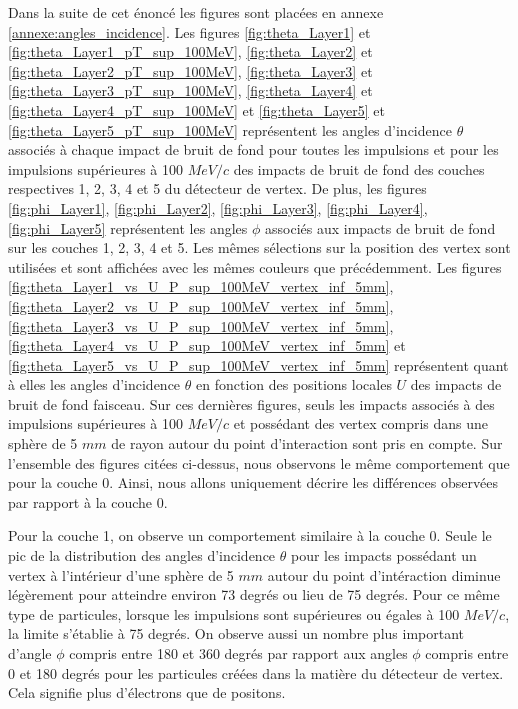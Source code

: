   Dans la suite de cet \'enonc\'e les figures sont plac\'ees en annexe \ref{annexe:angles_incidence}. Les figures \ref{fig:theta_Layer1} et \ref{fig:theta_Layer1_pT_sup_100MeV}, \ref{fig:theta_Layer2} et \ref{fig:theta_Layer2_pT_sup_100MeV}, \ref{fig:theta_Layer3} et \ref{fig:theta_Layer3_pT_sup_100MeV}, \ref{fig:theta_Layer4} et \ref{fig:theta_Layer4_pT_sup_100MeV} et \ref{fig:theta_Layer5} et \ref{fig:theta_Layer5_pT_sup_100MeV} repr\'esentent les angles d'incidence $\theta$ associ\'es \`a chaque impact de bruit de fond pour toutes les impulsions et pour les impulsions sup\'erieures \`a 100 $MeV/c$ des impacts de bruit de fond des couches respectives 1, 2, 3, 4 et 5 du d\'etecteur de vertex. De plus, les figures \ref{fig:phi_Layer1},  \ref{fig:phi_Layer2}, \ref{fig:phi_Layer3}, \ref{fig:phi_Layer4}, \ref{fig:phi_Layer5} repr\'esentent les angles $\phi$ associ\'es aux impacts de bruit de fond sur les couches 1, 2, 3, 4 et 5. Les m\^emes s\'elections sur la position des vertex sont utilis\'ees et sont affich\'ees avec les m\^emes couleurs que pr\'ec\'edemment. Les figures \ref{fig:theta_Layer1_vs_U_P_sup_100MeV_vertex_inf_5mm}, \ref{fig:theta_Layer2_vs_U_P_sup_100MeV_vertex_inf_5mm}, \ref{fig:theta_Layer3_vs_U_P_sup_100MeV_vertex_inf_5mm}, \ref{fig:theta_Layer4_vs_U_P_sup_100MeV_vertex_inf_5mm} et \ref{fig:theta_Layer5_vs_U_P_sup_100MeV_vertex_inf_5mm} repr\'esentent quant \`a elles les angles d'incidence $\theta$ en fonction des positions locales $U$ des impacts de bruit de fond faisceau. Sur ces derni\`eres figures, seuls les impacts associ\'es \`a  des impulsions sup\'erieures \`a 100 $MeV/c$ et poss\'edant des vertex compris dans une sph\`ere de 5 $mm$ de rayon autour du point d'interaction sont pris en compte. Sur l'ensemble des figures cit\'ees ci-dessus, nous observons le m\^eme comportement que pour la couche 0. Ainsi, nous allons uniquement d\'ecrire les diff\'erences observ\'ees par rapport \`a la couche 0.
  
  \medskip

  Pour la couche 1, on observe un comportement similaire \`a la couche 0. Seule le pic de la distribution des angles d'incidence $\theta$ pour les impacts poss\'edant un vertex \`a l'int\'erieur d'une sphère de 5 $mm$ autour du point d'intéraction diminue l\'eg\`erement pour atteindre environ 73 degr\'es ou lieu de 75 degr\'es. Pour ce m\^eme type de particules, lorsque les impulsions sont sup\'erieures ou \'egales \`a 100 $MeV/c$, la limite s'\'etablie \`a 75 degr\'es. On observe aussi un nombre plus important d'angle $\phi$ compris entre 180 et 360 degr\'es par rapport aux angles $\phi$ compris entre 0 et 180 degr\'es pour les particules cr\'e\'ees dans la mati\`ere du détecteur de vertex. Cela signifie plus d'\'electrons que de positons.
  
